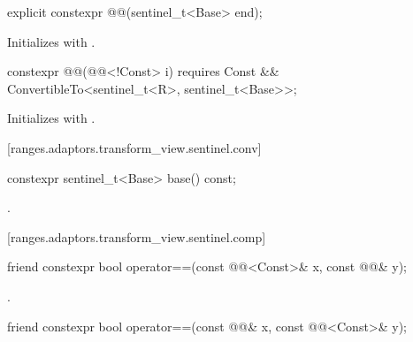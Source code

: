 \begin{itemdecl}
explicit constexpr @@(sentinel_t<Base> end);
\end{itemdecl}

\begin{itemdescr}
\pnum
\effects Initializes  with .
\end{itemdescr}

\begin{itemdecl}
constexpr @@(@@<!Const> i)
  requires Const && ConvertibleTo<sentinel_t<R>, sentinel_t<Base>>;
\end{itemdecl}

\begin{itemdescr}
\pnum
\effects Initializes  with .
\end{itemdescr}

[ranges.adaptors.transform_view.sentinel.conv]{}

\begin{itemdecl}
constexpr sentinel_t<Base> base() const;
\end{itemdecl}

\begin{itemdescr}
\pnum
\returns {}.
\end{itemdescr}

[ranges.adaptors.transform_view.sentinel.comp]{}

\begin{itemdecl}
friend constexpr bool operator==(const @@<Const>& x, const @@& y);
\end{itemdecl}

\begin{itemdescr}
\pnum
\returns {}.
\end{itemdescr}

\begin{itemdecl}
friend constexpr bool operator==(const @@& x, const @@<Const>& y);
\end{itemdecl}

